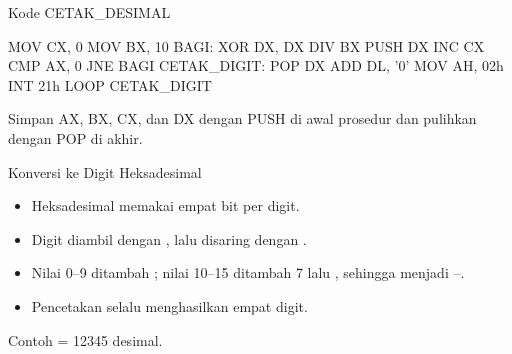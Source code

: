 \documentclass[aspectratio=169,11pt]{beamer}
\begin{document}
\begin{frame}[fragile]{Kode CETAK\_DESIMAL}
\begin{kodeasm}
MOV CX, 0
MOV BX, 10
BAGI:
    XOR DX, DX
    DIV BX
    PUSH DX
    INC CX
    CMP AX, 0
    JNE BAGI
CETAK_DIGIT:
    POP DX
    ADD DL, '0'
    MOV AH, 02h
    INT 21h
    LOOP CETAK_DIGIT
\end{kodeasm}

\vspace{0.1em}
{\footnotesize\color{obeGray}Simpan AX, BX, CX, dan DX dengan PUSH
di awal prosedur dan pulihkan dengan POP di akhir.\par}
\end{frame}

\begin{frame}{Konversi ke Digit Heksadesimal}
\small
\begin{itemize}
    \item Heksadesimal memakai empat bit per digit.

    \vspace{0.18em}
    \item Digit diambil dengan , lalu disaring
          dengan .

    \vspace{0.18em}
    \item Nilai 0--9 ditambah ; nilai 10--15 ditambah 7
          lalu , sehingga menjadi --.

    \vspace{0.18em}
    \item Pencetakan selalu menghasilkan empat digit.
\end{itemize}

\vspace{0.25em}
\begin{block}{Contoh}
\small {} = 12345 desimal.
\end{block}
\end{frame}
\end{document}
